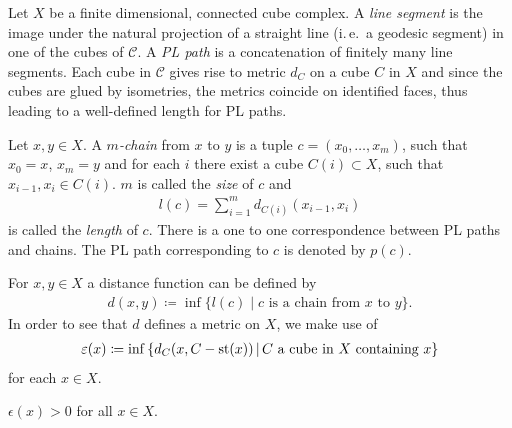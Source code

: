 \begin{defin}
  Let \(X\) be a finite dimensional, connected cube complex. A \emph{line segment} is the image under the natural projection of a straight line (i.\,e.\ a geodesic segment) in one of the cubes of \(\mathcal{C}\). A \emph{PL path} is a concatenation of finitely many line segments. Each cube in \(\mathcal{C}\) gives rise to metric \(d_C\) on a cube \(C\) in \(X\) and since the cubes are glued by isometries, the metrics coincide on identified faces, thus leading to a well-defined length for PL paths.

  Let \(x,y \in X\). A \emph{\(m\)-chain} from \(x\) to \(y\) is a tuple \(c = (x_0, \dots, x_m)\), such that \(x_0 = x\), \(x_m = y\) and for each \(i\) there exist a cube \(C(i) \subset X\), such that \(x_{i-1}, x_{i} \in C(i)\). \(m\) is called the \emph{size} of \(c\) and
  \begin{align*}
    l(c) = \sum_{i=1}^m d_{C(i)}(x_{i-1}, x_i)
  \end{align*}
  is called the \emph{length} of \(c\). There is a one to one correspondence between PL paths and chains. The PL path corresponding to \(c\) is denoted by \(p(c)\).

  For \(x,y \in X\) a distance function can be defined by
  \begin{align*}
    d(x,y) \coloneqq \inf \{l(c) \mid c \text{ is a chain from } x \text{ to } y\}.
  \end{align*}
  In order to see that \(d\) defines a metric on \(X\), we make use of
  \begin{align*}
    \varepsilon(x) \coloneqq \inf\left\{ d_C(x, C - \operatorname{st}(x)) \,\middle|\, C \text{ a cube in } X \text{ containing } x\right\}
  \end{align*}
  for each \(x \in X\).
\end{defin}

\begin{lemma}
  \(\epsilon(x) > 0\) for all \(x \in X\).
\end{lemma}

